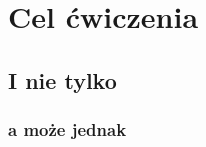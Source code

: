 \documentclass[12pt, titlepage]{article} %
\begin{document}


\section{Cel ćwiczenia}
\subsection{I nie tylko}
\subsubsection{a może jednak}




\end{document}
